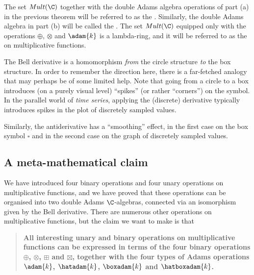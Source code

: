 \documentclass[a4paper]{article}
\begin{document}
\begin{definition}
The set $Mult(\C)$ together with the double Adams algebra operations of part (a) in the previous theorem will be referred to as the . Similarly, the double Adams algebra in part (b) will be called the . The set $Mult(\C)$ equipped only with the operations $\oplus$, $\otimes$ and $\adam{k}$ is a lambda-ring, and it will be referred to as the  on multiplicative functions.
 \end{definition}


\begin{remark}
The Bell derivative is a homomorphism \emph{from} the circle structure \emph{to} the box structure. In order to remember the direction here, there is a far-fetched analogy that may perhaps be of some limited help. Note that going from a circle to a box introduces (on a purely visual level) ``spikes'' (or rather ``corners'') on the symbol. In the parallel world of \emph{time series}, applying the (discrete) derivative typically introduces spikes in the plot of discretely sampled values. 

Similarly, the antiderivative has a ``smoothing'' effect, in the first case on the box symbol $\square$ and in the second case on the graph of discretely sampled values. 


\end{remark}



\subsection{A meta-mathematical claim}

We have introduced four binary operations and four unary operations on multiplicative functions, and we have proved that these operations can be organised into two double Adams $\C$-algebras, connected via an isomorphism given by the Bell derivative. There are numerous other operations on multiplicative functions, but the claim we want to make is that
\begin{quote}
\textbf{All interesting unary and binary operations on multiplicative functions can be expressed in terms of the four binary operations $\oplus$, $\otimes$, $\boxplus$ and $\boxtimes$, together with the four types of Adams operations $\adam{k}$, $\hatadam{k}$, $\boxadam{k}$ and $\hatboxadam{k}$.}
\end{quote}
\end{document}
